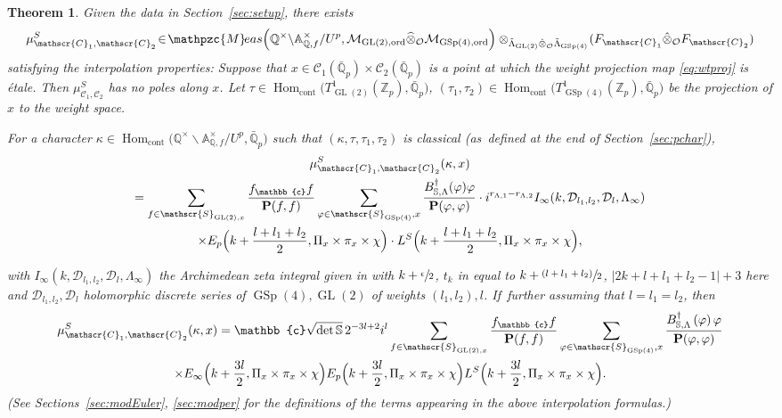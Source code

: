 \documentclass[JEP,XML,SOM,Unicode,published]{cedram}
\newcommand{\psfrac}[2]{\sfrac{(#1)}{#2}}
\theoremstyle{plain}
\newtheorem{thm}{Theorem}[subsection]
\theoremstyle{remark}
\newcommand{\bA}{\mathbb{A}}
\newcommand{\bQ}{\mathbb{Q}}
\newcommand{\bS}{\mathbb{S}}
\newcommand{\bZ}{\mathbb{Z}}
\newcommand{\bbc}{\mathbb{c}}
\newcommand{\cD}{\mathcal{D}}
\newcommand{\cM}{\mathcal{M}}
\newcommand{\cO}{\mathcal{O}}
\newcommand{\sC}{\mathscr{C}}
\newcommand{\sS}{\mathscr{S}}
\newcommand{\bfP}{\mathbf{P}}
\DeclareMathOperator{\GL}{GL}
\DeclareMathOperator{\GSp}{GSp}
\newcommand{\Meas}{\mathpzc{M}\mkern-2mu eas}
\newcommand{\cont}{\mathrm{cont}}
\newcommand{\ord}{\mathrm{ord}}
\DeclareMathOperator{\Hom}{Hom}
\let\wh\widehat
\let\bes B
\newcommand{\sLambda}{\scriptscriptstyle{\Lambda}}
\begin{document}
\begin{thm}\label{thm:pFL1}
Given the data in Section~\ref{sec:setup}, there exists
\[
\mu^S_{\sC_1,\sC_2}\!\in\!
\Meas\Bigl(\bQ^\times\backslash\bA^\times_{\bQ,f}/U^p,\cM_{\GL(2),\ord}\wh{\otimes}_{\cO} \cM_{\GSp(4),\ord}\Bigr)
\otimes_{\tilde{\Lambda}_{\GL(2)}\hat{\otimes}_\cO\tilde{\Lambda}_{\GSp(4)}}\!(F_{\sC_1}\hat{\otimes}_\cO F_{\sC_2})
\]
satisfying the interpolation properties: Suppose that $x\in \sC_1(\bar{\bQ}_p)\times\sC_2(\bar{\bQ}_p)$ is a point at which the weight projection map \eqref{eq:wtproj} is \'{e}tale. Then $ \mu^S_{\sC_1,\sC_2}$ has no poles along $x$. Let $\tau\in\Hom_\cont\bigl(T^1_{\GL(2)}(\bZ_p),\bar{\bQ}_p\bigr)$, $(\tau_1,\tau_2)\in \Hom_\cont\bigl(T^1_{\GSp(4)}(\bZ_p),\bar{\bQ}_p\bigr)$ be the projection of $x$ to the weight space.
\par\noindent
\begin{minipage}{\textwidth}
For a character $\kappa\in \Hom_\cont\bigl(\bQ^\times\backslash\bA^\times_{\bQ,f}/U^p,\bar{\bQ}_p\bigr)$ such that $(\kappa,\tau,\tau_1,\tau_2)$ is classical (as~defined at the end of Section~\ref{sec:pchar}),
\begin{multline}\label{eq:partial-int}
\mu^S_{\sC_1,\sC_2}(\kappa,x)\\
=\sum_{f\in \sS_{\GL(2),x}} \frac{f_{\bbc}f}{\bfP(f,f)}\sum_{\varphi\in \sS_{\GSp(4)},x} \frac{\bes^\dagger_{\bS,\Lambda}(\varphi)\varphi}{\bfP(\varphi,\varphi)}
\cdot i^{r_{\sLambda,1}-r_{\sLambda,2}} I_\infty(k,\cD_{l_1,l_2},\cD_l,\Lambda_\infty)\\
\times E_p\Bigl(k+\frac{l+l_1+l_2}{2},\Pi_x\times\pi_x\times \chi\Bigr)\cdot L^S\Bigl(k+\frac{l+l_1+l_2}{2},\Pi_x\times\pi_x\times \chi\Bigr),
\end{multline}
\end{minipage}
\par\smallskip\noindent
with $I_\infty(k,\cD_{l_1,l_2},\cD_l,\Lambda_\infty)$ the Archimedean zeta integral given in \cite[(4.2.5)]{pFL} with $k+\sfrac{\epsilon}{2}$, $t_k$ in \loccit equal to $k+\psfrac{l+l_1+l_2}{2}$, $|2k+l+l_1+l_2-1|+3$ here and $\cD_{l_1,l_2},\cD_l$ holomorphic discrete series of $\GSp(4),\GL(2)$ of weights $(l_1,l_2),l$. If~further assuming that $l=l_1=l_2$, then
\begin{multline*}
\mu^S_{\sC_1,\sC_2}(\kappa,x)
=\bbc\sqrt{\det\bS}\,2^{-3l+2}i^l\sum_{f\in \sS_{\GL(2),x}} \frac{f_{\bbc}f}{\bfP(f,f)}\sum_{\varphi\in \sS_{\GSp(4)},x} \frac{\bes^\dagger_{\bS,\Lambda}\left(\varphi\right)\varphi}{\bfP(\varphi,\varphi)} \\
\times E_\infty \Bigl(k+\frac{3l}{2},\Pi_x\times\pi_x\times \chi\Bigr) E_p\Bigl(k+\frac{3l}{2},\Pi_x\times\pi_x\times \chi\Bigr) L^S\Bigl(k+\frac{3l}{2},\Pi_x\times\pi_x\times \chi\Bigr).
\end{multline*}
(See Sections~\ref{sec:modEuler}, \ref{sec:modper} for the definitions of the terms appearing in the above inter\-polation formulas.)
\end{thm}
\end{document}
